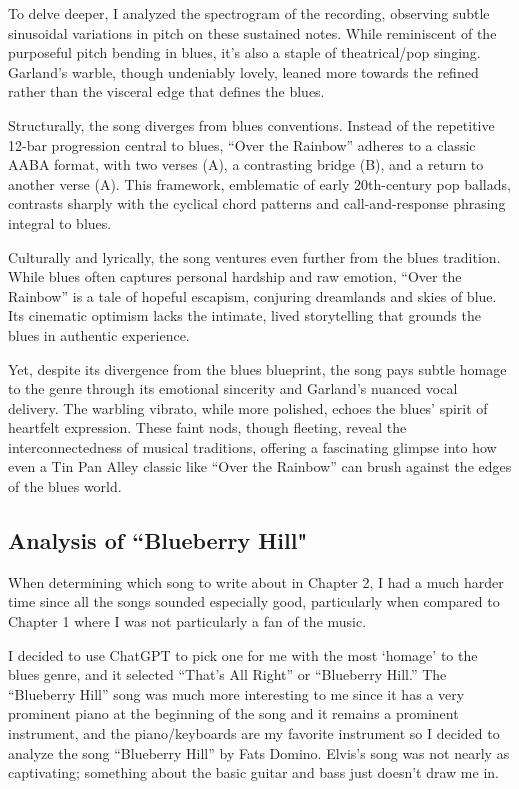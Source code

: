 \documentclass[12pt]{article}
\begin{document}
To delve deeper, I analyzed the spectrogram of the recording, observing subtle sinusoidal variations in pitch on these sustained notes. While reminiscent of the purposeful pitch bending in blues, it’s also a staple of theatrical/pop singing. Garland’s warble, though undeniably lovely, leaned more towards the refined rather than the visceral edge that defines the blues.

Structurally, the song diverges from blues conventions. Instead of the repetitive 12-bar progression central to blues, “Over the Rainbow” adheres to a classic AABA format, with two verses (A), a contrasting bridge (B), and a return to another verse (A). This framework, emblematic of early 20th-century pop ballads, contrasts sharply with the cyclical chord patterns and call-and-response phrasing integral to blues.

Culturally and lyrically, the song ventures even further from the blues tradition. While blues often captures personal hardship and raw emotion, “Over the Rainbow” is a tale of hopeful escapism, conjuring dreamlands and skies of blue. Its cinematic optimism lacks the intimate, lived storytelling that grounds the blues in authentic experience.

Yet, despite its divergence from the blues blueprint, the song pays subtle homage to the genre through its emotional sincerity and Garland’s nuanced vocal delivery. The warbling vibrato, while more polished, echoes the blues’ spirit of heartfelt expression. These faint nods, though fleeting, reveal the interconnectedness of musical traditions, offering a fascinating glimpse into how even a Tin Pan Alley classic like “Over the Rainbow” can brush against the edges of the blues world.

\subsection*{Analysis of ``Blueberry Hill"}

When determining which song to write about in Chapter 2, I had a much harder time since all the songs sounded especially good, particularly when compared to Chapter 1 where I was not particularly a fan of the music.

I decided to use ChatGPT to pick one for me with the most `homage' to the blues genre, and it selected ``That's All Right'' or ``Blueberry Hill.'' The ``Blueberry Hill'' song was much more interesting to me since it has a very prominent piano at the beginning of the song and it remains a prominent instrument, and the piano/keyboards are my favorite instrument so I decided to analyze the song ``Blueberry Hill'' by Fats Domino. Elvis’s song was not nearly as captivating; something about the basic guitar and bass just doesn't draw me in.
\end{document}
